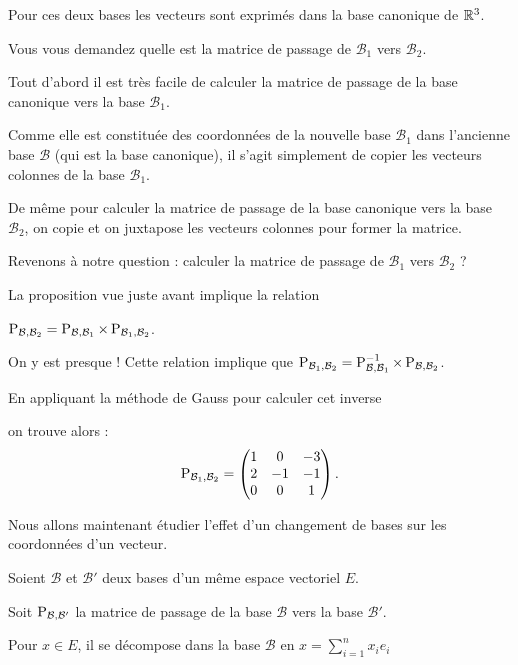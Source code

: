 Pour ces deux bases les vecteurs sont exprimés dans la base canonique
de $\mathbb{R}^3$.

\change
Vous vous demandez quelle est la matrice de passage de $\mathcal{B}_1$ vers $\mathcal{B}_2$.

\change
Tout d'abord il est très facile de calculer la matrice de passage de la base canonique vers la base 
$\mathcal{B}_1$. 

Comme elle est constituée des coordonnées de la nouvelle base $\mathcal{B}_1$ dans l'ancienne base $\mathcal{B}$ (qui est la base canonique), il s'agit simplement de copier les vecteurs colonnes de la base $\mathcal{B}_1$.

\change
De même pour calculer la matrice de passage de la base canonique vers la base 
$\mathcal{B}_2$, on copie et on juxtapose les vecteurs colonnes pour former la matrice.

Revenons à notre question : calculer la matrice de passage de $\mathcal{B}_1$ vers $\mathcal{B}_2$ ?

\change
La proposition vue juste avant implique la relation

$\mathop{\text{P}}\nolimits_{\mathcal{B}, \mathcal{B}_2} = \mathop{\text{P}}\nolimits_{\mathcal{B}, \mathcal{B}_1} \times \mathop{\text{P}}\nolimits_{\mathcal{B}_1, \mathcal{B}_2}$.

\change
On y est presque ! Cette relation implique 
que 
$\mathop{\text{P}}\nolimits_{\mathcal{B}_1, \mathcal{B}_2} =  \mathop{\text{P}}\nolimits_{\mathcal{B}, \mathcal{B}_1}^{-1} \times \mathop{\text{P}}\nolimits_{\mathcal{B}, \mathcal{B}_2}$.


\change
En appliquant la méthode de Gauss pour calculer cet inverse 

\change
on trouve alors :
$$\mathop{\text{P}}\nolimits_{\mathcal{B}_1, \mathcal{B}_2} 
= \begin{pmatrix}
1 & 0 & -3\\
2 & -1 & -1\\
0 & 0 & 1
\end{pmatrix}.$$


\diapo

Nous allons maintenant étudier l'effet d'un changement de bases sur
les coordonnées d'un vecteur.

Soient $\mathcal{B}$ et 
$\mathcal{B}'$ deux bases d'un même espace vectoriel $E$. 


\change
Soit $\mathop{\text{P}}\nolimits_{\mathcal{B},\mathcal{B}'}$ la matrice de passage de 
la base $\mathcal{B}$ vers la base $\mathcal{B}'$. 

\change
Pour $x \in E$, il se décompose dans la base $\mathcal{B}$ en $x=\sum_{i=1}^n x_ie_i$

